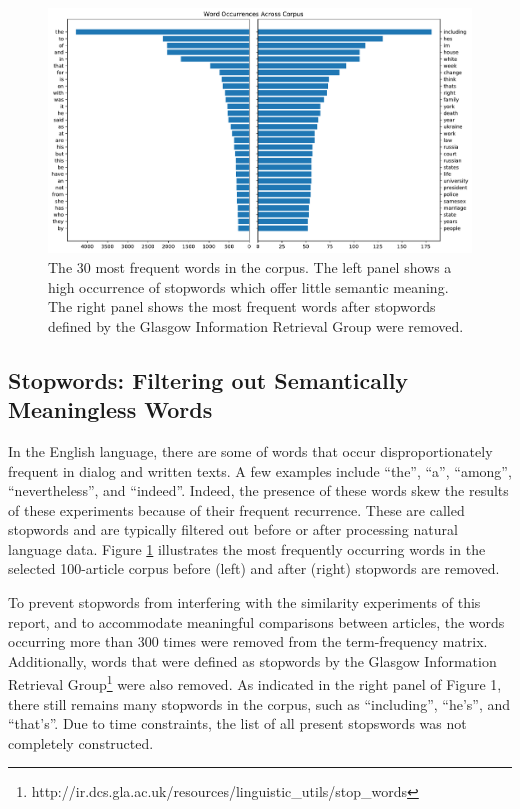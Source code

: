 \documentclass[11pt]{article}
\begin{document}
\begin{figure}[h] \label{fig:stopwords}
  \centering
  \includegraphics[width=\textwidth]{figures/stopwords}
  \caption{The 30 most frequent words in the corpus. The left panel shows a high occurrence of stopwords which offer little semantic meaning. The right panel shows the most frequent words after stopwords defined by the Glasgow Information Retrieval Group were removed.}
\end{figure}

\subsection{Stopwords: Filtering out Semantically Meaningless Words} \label{sec:stopwords}

In the English language, there are some of words that occur disproportionately frequent in dialog and written texts.
A few examples include ``the'', ``a'', ``among'', ``nevertheless'', and ``indeed''.
Indeed, the presence of these words skew the results of these experiments because of their frequent recurrence.
These are called stopwords and are typically filtered out before or after processing natural language data.
Figure \ref{fig:stopwords} illustrates the most frequently occurring words in the selected 100-article corpus before (left) and after (right) stopwords are removed.

To prevent stopwords from interfering with the similarity experiments of this report, and to accommodate meaningful comparisons between articles, the words occurring more than 300 times were removed from the term-frequency matrix.
Additionally, words that were defined as stopwords by the Glasgow Information
Retrieval Group\footnote{http://ir.dcs.gla.ac.uk/resources/linguistic\_utils/stop\_words} were also removed.
As indicated in the right panel of Figure 1, there still remains many stopwords in the corpus, such as ``including'', ``he's'', and ``that's''.
Due to time constraints, the list of all present stopswords was not completely constructed.
\end{document}
